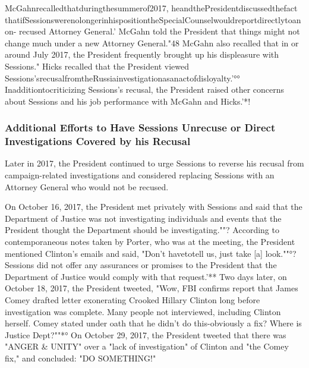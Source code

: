 McGahnrecalledthatduringthesummerof2017, heandthePresidentdiscussedthefact thatifSessionswerenolongerinhispositiontheSpecialCounselwouldreportdirectlytoanon- recused Attorney General.'
McGahn told the President that things might not change much under a new Attorney General."48
McGahn also recalled that in or around July 2017, the President frequently brought up his displeasure with Sessions."
Hicks recalled that the President viewed Sessions'srecusalfromtheRussiainvestigationasanactofdisloyalty.'°°
Inadditiontocriticizing Sessions's recusal, the President raised other concerns about Sessions and his job performance with McGahn and Hicks.'*!

\subsubsection{Additional Efforts to Have Sessions Unrecuse or Direct Investigations Covered by his Recusal}

Later in 2017, the President continued to urge Sessions to reverse his recusal from campaign-related investigations and considered replacing Sessions with an Attorney General who would not be recused.

On October 16, 2017, the President met privately with Sessions and said that the Department of Justice was not investigating individuals and events that the President thought the Department should be investigating.""?
According to contemporaneous notes taken by Porter, who was at the meeting, the President mentioned Clinton's emails and said, "Don't havetotell us, just take [a] look.""°?
Sessions did not offer any assurances or promises to the President that the Department of Justice would comply with that request.'**
Two days later, on October 18, 2017, the President tweeted, "Wow, FBI confirms report that James Comey drafted letter exonerating Crooked Hillary Clinton long before investigation was complete.
Many people not interviewed, including Clinton herself.
Comey stated under oath that he didn't do this-obviously a fix? Where is Justice Dept?""*°
On October 29, 2017, the President tweeted that there was "ANGER & UNITY" over a "lack of investigation" of Clinton and "the Comey fix," and concluded: "DO SOMETHING!"

